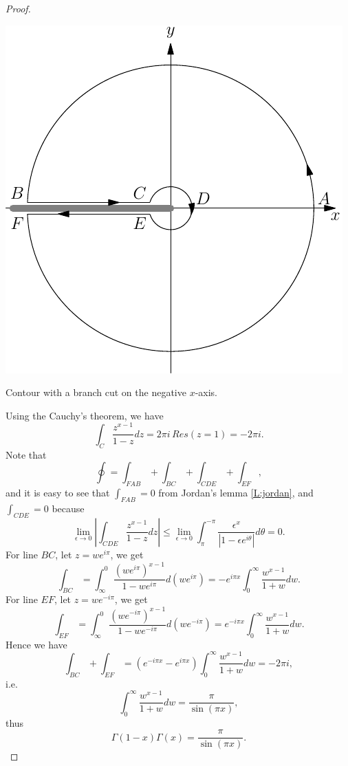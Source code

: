 \begin{proof}
\begin{marginfigure} \label{F:cont_gamma}
  \includegraphics{graphics/contour_euler.pdf}
	\caption{Contour with a branch cut on the negative $x$-axis.}
\end{marginfigure}

Using the Cauchy's theorem, we have
\[
   \int_C \frac{z^{x-1}}{1-z} dz = 2\pi i \, Res(z=1) = -2\pi i.
\]
Note that
\[
  \oint = \int_{FAB} + \int_{BC} + \int_{CDE} + \int_{EF},
\]
and it is easy to see that $\int_{FAB}=0$ from Jordan's lemma \ref{L:jordan}, 
and $\int_{CDE}=0$ because
\[
  \lim_{\epsilon\to 0} \left| \int_{CDE} \frac{z^{x-1}}{1-z} dz \right|
    \le \lim_{\epsilon\to 0} \int_{\pi}^{-\pi} 
      \frac{\epsilon^{x}}{|1-\epsilon e^{i\theta}|} d\theta 
    = 0.
\]
For line $BC$, let $z=w e^{i\pi}$, we get
\[
  \int_{BC} = \int_{\infty}^0 \frac{(we^{i\pi})^{x-1}}{1-we^{i\pi}} d(we^{i\pi})
     = -e^{i\pi x} \int_0^{\infty} \frac{w^{x-1}}{1+w} dw.
\]
For line $EF$, let $z=w e^{-i\pi}$, we get
\[
  \int_{EF} = \int_{\infty}^0 \frac{(we^{-i\pi})^{x-1}}{1-we^{-i\pi}} d(we^{-i\pi})
     = e^{-i\pi x} \int_0^{\infty} \frac{w^{x-1}}{1+w} dw.
\]
Hence we have
\[
  \int_{BC}+\int_{EF} 
    = (e^{-i\pi x}-e^{i\pi x}) \int_0^{\infty} \frac{w^{x-1}}{1+w} dw
    =-2\pi i,
\]
i.e.
\[
   \int_0^{\infty} \frac{w^{x-1}}{1+w} dw = \frac{\pi}{\sin(\pi x)},
\]
thus
\[
  \Gamma(1-x) \Gamma(x) = \frac{\pi}{\sin(\pi x)}.
 \]
\end{proof}


